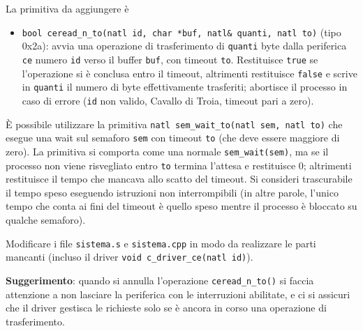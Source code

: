 La primitiva da aggiungere \`e
\begin{itemize}
  \item \verb|bool ceread_n_to(natl id, char *buf, natl& quanti, natl to)| (tipo 0x2a):
    avvia una operazione di trasferimento di \verb|quanti| byte dalla periferica \verb|ce|
    numero \verb|id| verso il buffer \verb|buf|, con timeout \verb|to|. Restituisce \verb|true| se
    l'operazione si \`e conclusa entro il timeout, altrimenti restituisce \verb|false|
    e scrive in \verb|quanti| il numero di byte effettivamente trasferiti; abortisce
    il processo in caso di errore (\verb|id| non valido, Cavallo di Troia, timeout pari a zero).
\end{itemize}

\`E possibile utilizzare la primitiva \verb|natl sem_wait_to(natl sem, natl to)|
che esegue una wait sul semaforo \verb|sem| con timeout \verb|to| (che
deve essere maggiore di zero).  La primitiva si comporta come una normale \verb|sem_wait(sem)|,
ma se il processo non viene risvegliato entro \verb|to| termina l'attesa e
restituisce 0; altrimenti restituisce il tempo che mancava allo scatto del timeout.
Si consideri trascurabile il tempo speso eseguendo istruzioni non interrompibili (in altre parole,
l'unico tempo che conta ai fini del timeout \`e quello speso mentre il processo \`e bloccato
su qualche semaforo).

Modificare i file \verb|sistema.s| e \verb|sistema.cpp| in modo da realizzare le parti mancanti
(incluso il driver \verb|void c_driver_ce(natl id)|).

{\bf Suggerimento}: quando si annulla l'operazione \verb|ceread_n_to()| si faccia attenzione
a non lasciare la periferica con le interruzioni abilitate, e ci si assicuri che il driver
gestisca le richieste solo se \`e ancora in corso una operazione di trasferimento.
